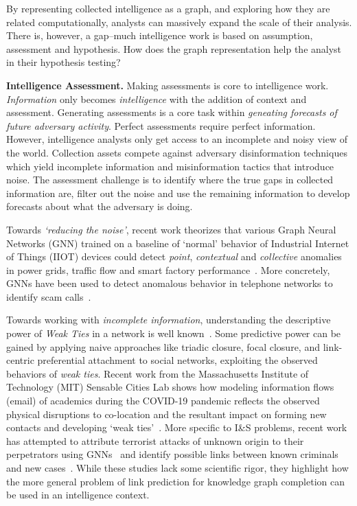 By representing collected intelligence as a graph, and exploring how they are related computationally, analysts can massively expand the scale of their analysis. 
There is, however, a gap--much intelligence work is based on assumption, assessment and hypothesis.
How does the graph representation help the analyst in their hypothesis testing? 

\textbf{Intelligence Assessment.}
Making assessments is core to intelligence work. 
\textit{Information} only becomes \textit{intelligence} with the addition of context and assessment. 
Generating assessments is a core task within \textit{geneating forecasts of future adversary activity}.
Perfect assessments require perfect information.
However, intelligence analysts only get access to an incomplete and noisy view of the world. 
Collection assets compete against adversary disinformation techniques which yield incomplete information and misinformation tactics that introduce noise.
The assessment challenge is to identify where the true gaps in collected information are, filter out the noise and use the remaining information to develop forecasts about what the adversary is doing.

Towards \textit{`reducing the noise'}, recent work theorizes that various Graph Neural Networks (GNN) trained on a baseline of `normal' behavior of Industrial Internet of Things (IIOT) devices could detect \textit{point}, \textit{contextual} and \textit{collective} anomalies in power grids, traffic flow and smart factory performance~\cite{Wu2021}.
More concretely, GNNs have been used to detect anomalous behavior in telephone networks to identify scam calls~\cite{Ren2023}.

Towards working with \textit{incomplete information}, understanding the descriptive power of \textit{Weak Ties} in a network is well known~\cite{Granovetter1973}. 
Some predictive power can be gained by applying naive approaches like triadic closure, focal closure, and link-centric preferential attachment to social networks, exploiting the observed behaviors of \textit{weak ties}.
Recent work from the Massachusetts Institute of Technology (MIT) Sensable Cities Lab shows how modeling information flows (email) of academics during the COVID-19 pandemic reflects the observed physical disruptions to co-location and the resultant impact on forming new contacts and developing `weak ties'~\cite{Carmody2022}. 
More specific to I\&S problems, recent work has attempted to attribute terrorist attacks of unknown origin to their perpetrators using GNNs~\cite{Bangerter2022} and identify possible links between known criminals and new cases~\cite{Ahmadi2023}. 
While these studies lack some scientific rigor, they highlight how the more general problem of link prediction for knowledge graph completion can be used in an intelligence context.

